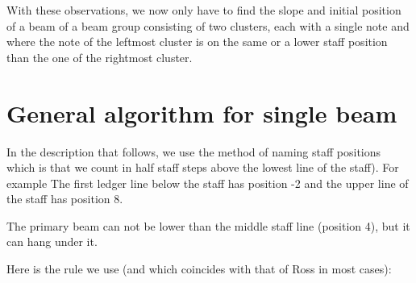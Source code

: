 With these observations, we now only have to find the slope and
initial position of a beam of a beam group consisting of two clusters,
each with a single note and where the note of the leftmost cluster is
on the same or a lower staff position than the one of the rightmost
cluster.  

\section{General algorithm for single beam}

In the description that follows, we use the {\gs} method of naming
staff positions which is that we count in half staff steps above the lowest
line of the staff).  For example The first ledger line below the staff has
position -2 and the upper line of the staff has position 8. 

The primary beam can not be lower than the middle staff line (position
4), but it can hang under it. 

Here is the rule we use (and which coincides with that of Ross in most
cases):

